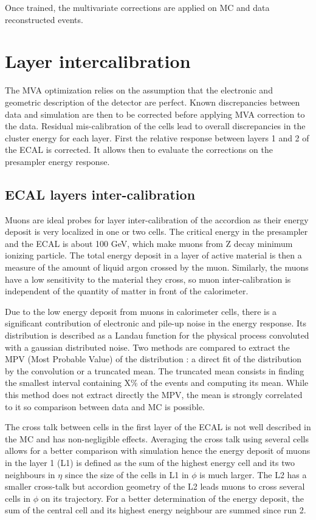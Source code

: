Once trained, the multivariate corrections are applied on MC and data reconstructed events.

\section{Layer intercalibration}
\label{sec:org0cd5325}


The MVA optimization relies on the assumption that the electronic and geometric description of the detector are perfect.
Known discrepancies between data and simulation are then to be corrected before applying MVA correction to the data.
Residual mis-calibration of the cells lead to overall discrepancies in the cluster energy for each layer.
First the relative response between layers 1 and 2 of the ECAL is corrected.
It allows then to evaluate the corrections on the presampler energy response.

\subsection{ECAL layers inter-calibration}
\label{sec:org9663735}

Muons are ideal probes for layer inter-calibration \cite{ATL-COM-PHYS-2013-1423,ATL-COM-PHYS-2017-760} of the accordion as their energy deposit is very localized in one or two cells.
The critical energy in the presampler and the ECAL is about 100 GeV, which make muons from Z decay minimum ionizing particle.
The total energy deposit in a layer of active material is then a measure of the amount of liquid argon crossed by the muon.
Similarly, the muons have a low sensitivity to the material they cross, so muon inter-calibration is independent of the quantity of matter in front of the calorimeter.

Due to the low energy deposit from muons in calorimeter cells, there is a significant contribution of electronic and pile-up noise in the energy response.
Its distribution is described as a Landau function for the physical process convoluted with a gaussian distributed noise.
Two methods are compared to extract the MPV (Most Probable Value) of the distribution : a direct fit of the distribution by the convolution or a truncated mean.
The truncated mean consists in finding the smallest interval containing X\% of the events and computing its mean.
While this method does not extract directly the MPV, the mean is strongly correlated to it so comparison between data and MC is possible.

The cross talk between cells in the first layer of the ECAL is not well described in the MC and has non-negligible effects.
Averaging the cross talk using several cells allows for a better comparison with simulation hence the energy deposit of muons in the layer 1 (L1) is defined as the sum of the highest energy cell and its two neighbours in $\eta$ since the size of the cells in L1 in $\phi$ is much larger.
The L2 has a smaller cross-talk but accordion geometry of the L2 leads muons to cross several cells in $\phi$ on its trajectory.
For a better determination of the energy deposit, the sum of the central cell and its highest energy neighbour are summed since run 2.

